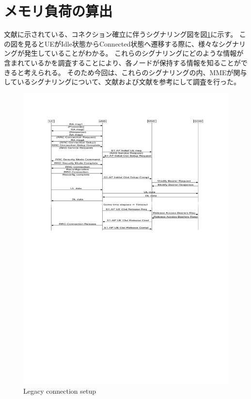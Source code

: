 \documentclass[a4j]{ujarticle}
\begin{document}
\clearpage
\section{メモリ負荷の算出}

文献\cite{3gpp.23.720}に示されている、コネクション確立に伴うシグナリング図を図\ref{Legacy_connection_setup}に示す。
この図を見るとUEがIdle状態からConnected状態へ遷移する際に、様々なシグナリングが発生していることがわかる。
これらのシグナリングにどのような情報が含まれているかを調査することにより、各ノードが保持する情報を知ることができると考えられる。
そのため今回は、これらのシグナリングの内、MMEが関与しているシグナリングについて、文献\cite{3gpp.36.413}および文献\cite{3gpp.29.274}を参考にして調査を行った。
\begin{figure}[htbp]
  \centering
  \includegraphics[width=0.9\hsize]{Legacy_connection_setup.pdf}
  \caption{Legacy connection setup}
  \label{Legacy_connection_setup}
\end{figure}
\end{document}
